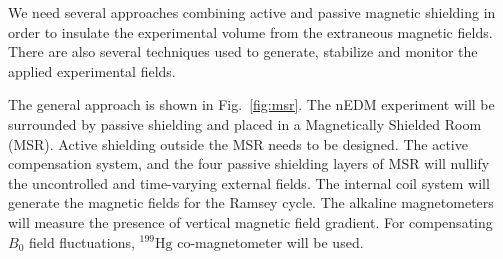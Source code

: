 We need several approaches combining active and passive magnetic shielding in order to insulate the experimental volume from the extraneous magnetic fields. There are also several techniques used to generate, stabilize and monitor the applied experimental fields. 


The general approach is shown in Fig.~\ref{fig:msr}. The nEDM experiment will be surrounded by passive shielding and placed in a Magnetically Shielded Room (MSR). Active shielding outside the MSR needs to be designed. The active compensation system, and the four passive shielding layers of MSR will nullify the uncontrolled and time-varying external fields. The internal coil system will generate the magnetic fields for the Ramsey cycle. The alkaline magnetometers will measure the presence of vertical magnetic field gradient. For compensating $B_0$ field fluctuations, $^{199}\mathrm{Hg}$ co-magnetometer will be used.






